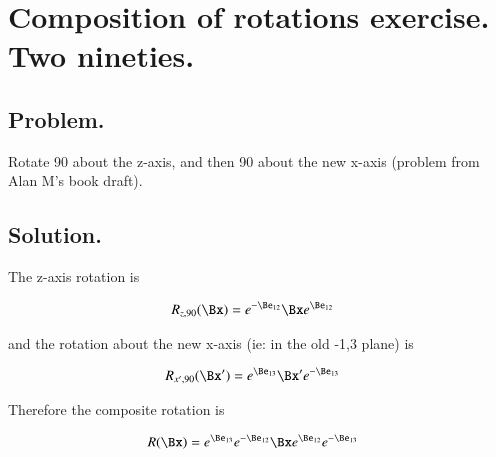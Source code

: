 
%
%




\chapter{Composition of rotations exercise.  Two nineties. }
\date{ Jan 17, 2009.  $RCSfile: twoNinetyRotations.tex,v $ Last $Revision: 1.7 $ $Date: 2009/06/11 17:00:37 $ }

%

\section{Problem. }

Rotate 90 about the z-axis, and then 90 about the new x-axis (problem from Alan M's book draft).

\section{Solution. }

The z-axis rotation is 

\begin{align*}
R_{z,90}(\Bx) &= e^{-\Be_{12}} \Bx e^{\Be_{12}}
\end{align*}

and the rotation about the new x-axis (ie: in the old -1,3 plane) is

\begin{align*}
R_{x',90}(\Bx') &= e^{\Be_{13}} \Bx' e^{-\Be_{13}}
\end{align*}

Therefore the composite rotation is

\begin{align*}
R(\Bx) &= e^{\Be_{13}} e^{-\Be_{12}} \Bx e^{\Be_{12}} e^{-\Be_{13}}
\end{align*}

